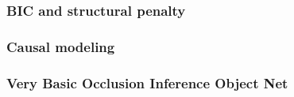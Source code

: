
\subsubsection*{BIC and structural penalty}
\blurb{}

\blurb{}

\blurb{}

\blurb{}

\blurb{}



\subsubsection*{Causal modeling}
\blurb{}

\blurb{}

\blurb{}

\blurb{}

\blurb{}


\subsubsection*{Very Basic Occlusion Inference Object Net}
\blurb{}


